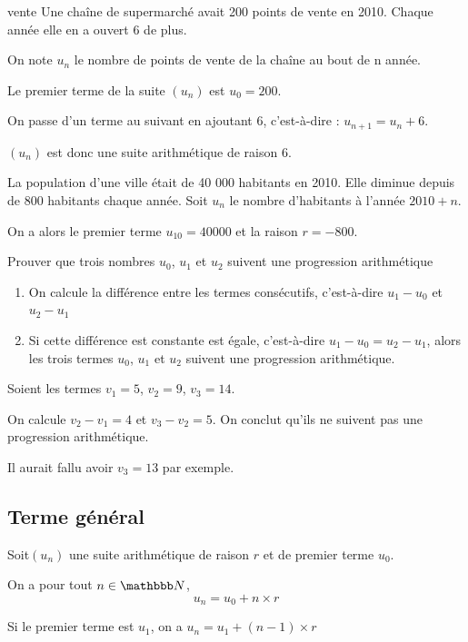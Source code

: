 \documentclass[10pt,a4paper,openany,twoside]{book}
\begin{document}
\begin{ex}{}{vente}
Une chaîne de supermarché avait 200 points de vente en 2010. Chaque année elle en a ouvert 6 de plus.

\noindent On note $u_n$ le nombre de points de vente de la chaîne au bout de n année.

\noindent Le premier terme de la suite $(u_n)$ est $u_0=200$.

\noindent On passe d'un terme au suivant en ajoutant 6, c'est-à-dire : $u_{n+1}=u_n+6$.

\noindent $(u_n)$ est donc une suite arithmétique de raison 6.
\end{ex}

\begin{ex}{}{}
	La population d'une ville était de 40 000 habitants en 2010. Elle diminue depuis de 800 habitants chaque année. Soit $u_n$ le nombre d'habitants à l'année $2010+n$.

	On a alors le premier terme $u_10 = 40 000$ et la raison $r=-800$.
\end{ex}
\begin{methode}{Prouver que trois nombres $u_0$, $u_1$ et $u_2$ suivent une progression arithmétique}{}
\begin{enumerate}
	\item On calcule la différence entre les termes consécutifs, c'est-à-dire $u_1-u_0$ et $u_2-u_1$
	\item
	Si cette différence est constante est égale, c'est-à-dire $u_1-u_0 = u_2-u_1$, alors les trois termes $u_0$, $u_1$ et $u_2$ suivent une progression arithmétique.
\end{enumerate}
\end{methode}

\begin{ex}{}{}
Soient les termes $v_1=5$, $v_2=9$, $v_3=14$.

On calcule $v_2-v_1=4$ et $v_3-v_2=5$. On conclut qu'ils ne suivent pas une progression arithmétique.

Il aurait fallu avoir $v_3=13$ par exemple.
\end{ex}

\subsection{Terme général}

\begin{prop}{}{}
Soit$(u_n)$ une suite arithmétique de raison $r$ et de premier terme $u_0$.

On a pour tout $n\in\N$, $$u_n=u_0+n \times r$$

Si le premier terme est $u_1$, on a $u_n=u_1+(n-1) \times r$
\end{prop}
\end{document}
